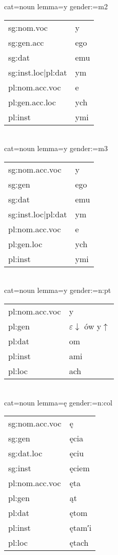 \documentclass{article}
\begin{document}
\begin{multicols}{2}
cat=noun lemma=y gender:=m2\\
\begin{tabular}{l|l}
sg:nom.voc & y\\
sg:gen.acc & ego\\
sg:dat & emu\\
sg:inst.loc|pl:dat & ym\\
pl:nom.acc.voc & e\\
pl:gen.acc.loc & ych\\
pl:inst & ymi\\
\end{tabular}\\

cat=noun lemma=y gender:=m3\\
\begin{tabular}{l|l}
sg:nom.acc.voc & y\\
sg:gen & ego\\
sg:dat & emu\\
sg:inst.loc|pl:dat & ym\\
pl:nom.acc.voc & e\\
pl:gen.loc & ych\\
pl:inst & ymi\\
\end{tabular}\\

cat=noun lemma=y gender:=n:pt\\
\begin{tabular}{l|l}
pl:nom.acc.voc & y\\
pl:gen & $\varepsilon\downarrow$ ów y$\uparrow$\\
pl:dat & om\\
pl:inst & ami\\
pl:loc & ach\\
\end{tabular}\\

cat=noun lemma=ę gender:=n:col\\
\begin{tabular}{l|l}
sg:nom.acc.voc & ę\\
sg:gen & ęcia\\
sg:dat.loc & ęciu\\
sg:inst & ęciem\\
pl:nom.acc.voc & ęta\\
pl:gen & ąt\\
pl:dat & ętom\\
pl:inst & ętam′i\\
pl:loc & ętach\\
\end{tabular}\\


\end{multicols}
\end{document}
